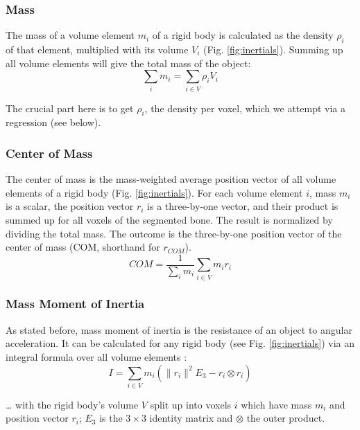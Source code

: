 \subsubsection{Mass}
\label{sec:orgfe0cb13}
The mass of a volume element \(m_{i}\) of a rigid body is calculated as the density \(\rho_{i}\) of that element, multiplied with its volume \(V_{i}\) (Fig. \ref{fig:inertials}).
Summing up all volume elements will give the total mass of the object:
\begin{equation}\label{eqn:mass}
\sum_{i} m_{i} = \sum\limits_{i \in V} \rho_{i} V_{i}
\end{equation}

The crucial part here is to get \(\rho_{i}\), the density per voxel, which we attempt via a regression (see below).


\subsubsection{Center of Mass}
\label{sec:org3abf09a}
The center of mass is the mass-weighted average position vector of all volume elements of a rigid body (Fig. \ref{fig:inertials}).
For each volume element \(i\), mass \(m_{i}\) is a scalar, the position vector \(r_{i}\) is a three-by-one vector, and their product is summed up for all voxels of the segmented bone.
The result is normalized by dividing the total mass.
The outcome is the three-by-one position vector of the center of mass (COM, shorthand for \(r_{COM}\)).
\begin{equation}\label{eqn:com}
 COM = \frac{1}{\sum_i m_{i}} \sum\limits_{i \in V} m_{i} r_{i}
\end{equation}


\subsubsection{Mass Moment of Inertia}
\label{sec:org4399097}
As stated before, mass moment of inertia is the resistance of an object to angular acceleration.
It can be calculated for any rigid body (see Fig. \ref{fig:inertials}) via an integral formula over all volume elements \citep{WikipediaMOI}:
\begin{equation}\label{eqn:mmoi}
 I = \sum\limits_{i \in V} m_{i} \left( \lVert r_{i} \rVert ^2 E_3 - r_{i} \otimes r_{i} \right)
\end{equation}

\ldots{} with the rigid body's volume \(V\) split up into voxels \(i\) which have mass \(m_i\) and position vector \(r_{i}\); \(E_{3}\) is the \(3\times 3\) identity matrix and \(\otimes\) the outer product.

